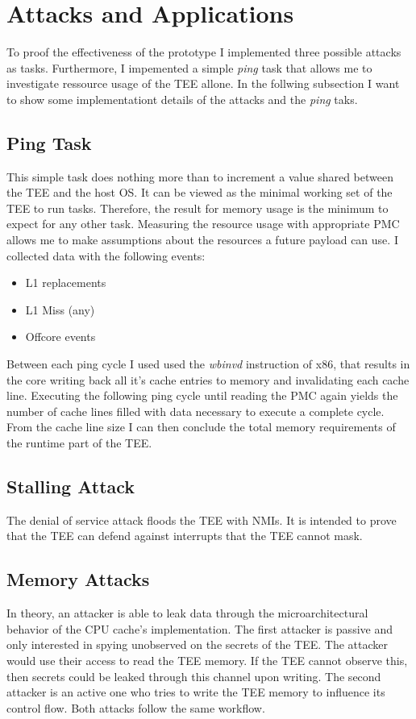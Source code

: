 \section{Attacks and Applications}
\label{sec:implementation:attacks}

To proof the effectiveness of the prototype I implemented three possible attacks
as tasks. Furthermore, I impemented a simple \textit{ping} task that allows me to
investigate ressource usage of the TEE allone. In the follwing subsection I want
to show some implementationt details of the attacks and the \textit{ping} taks.

\subsection{Ping Task}
\label{sec:implementation:attacks:ping}
This simple task does nothing more than to increment a value shared between the
TEE and the host OS. It can be viewed as the minimal working set of the TEE to
run tasks. Therefore, the result for memory usage is the minimum to expect for
any other task. Measuring the resource usage with appropriate PMC allows me to
make assumptions about the resources a future payload can use. I collected data
with the following events:
\begin{itemize}
    \item L1 replacements
    \item L1 Miss (any)
    \item Offcore events 
\end{itemize}
Between each ping cycle I used used the \textit{wbinvd} instruction of x86, that
results in the core writing back all it's cache entries to memory and
invalidating each cache line. Executing the following ping cycle until reading
the PMC again yields the number of cache lines filled with data necessary to
execute a complete cycle. From the cache line size I can then conclude the total
memory requirements of the runtime part of the TEE.

\subsection{Stalling Attack}
The denial of service attack floods the TEE with NMIs. It is intended to prove
that the TEE can defend against interrupts that the TEE cannot mask.


\subsection{Memory Attacks}
\label{sec:implementation:attacks:memory}
In theory, an attacker is able to leak data through the microarchitectural
behavior of the CPU cache's implementation. The first attacker is passive and
only interested in spying unobserved on the secrets of the TEE. The attacker
would use their access to read the TEE memory. If the TEE cannot observe this,
then secrets could be leaked through this channel upon writing. The second
attacker is an active one who tries to write the TEE memory to influence its
control flow. Both attacks follow the same workflow.\\


